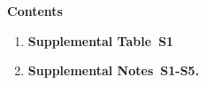 \documentclass{article}
\begin{document}
\setcounter{figure}{0}
\setcounter{table}{0}
\setcounter{section}{0}
\setcounter{page}{1}
\makeatletter
\renewcommand{\thetable}{S\@arabic\c@table}
\renewcommand{\theHtable}{S\@arabic\c@table}
\renewcommand{\thesection}{S\@arabic\c@section}
\renewcommand{\theHsection}{S\@arabic\c@section}

\vspace*{1cm}

{\bf \large Contents}

\begin{enumerate}
    \item \textbf{Supplemental Table~S1}
    \item \textbf{Supplemental Notes~S1-S5.}
\end{enumerate}


\clearpage

\end{document}

